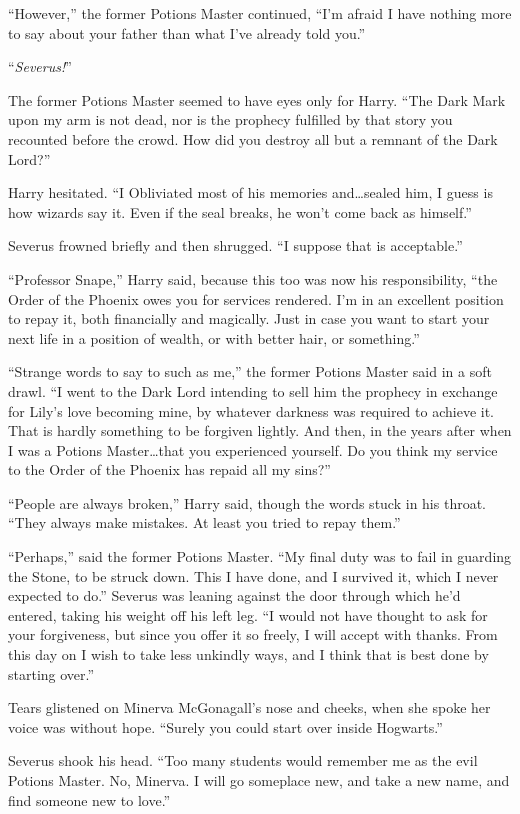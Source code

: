 “However,” the former Potions Master continued, “I’m afraid I have nothing more to say about your father than what I’ve already told you.”

“\emph{Severus!}”

The former Potions Master seemed to have eyes only for Harry. “The Dark Mark upon my arm is not dead, nor is the prophecy fulfilled by that story you recounted before the crowd. How did you destroy all but a remnant of the Dark Lord?”

Harry hesitated. “I Obliviated most of his memories and…sealed him, I guess is how wizards say it. Even if the seal breaks, he won’t come back as himself.”

Severus frowned briefly and then shrugged. “I suppose that is acceptable.”

“Professor Snape,” Harry said, because this too was now his responsibility, “the Order of the Phoenix owes you for services rendered. I’m in an excellent position to repay it, both financially and magically. Just in case you want to start your next life in a position of wealth, or with better hair, or something.”

“Strange words to say to such as me,” the former Potions Master said in a soft drawl. “I went to the Dark Lord intending to sell him the prophecy in exchange for Lily’s love becoming mine, by whatever darkness was required to achieve it. That is hardly something to be forgiven lightly. And then, in the years after when I was a Potions Master…that you experienced yourself. Do you think my service to the Order of the Phoenix has repaid all my sins?”

“People are always broken,” Harry said, though the words stuck in his throat. “They always make mistakes. At least you tried to repay them.”

“Perhaps,” said the former Potions Master. “My final duty was to fail in guarding the Stone, to be struck down. This I have done, and I survived it, which I never expected to do.” Severus was leaning against the door through which he’d entered, taking his weight off his left leg. “I would not have thought to ask for your forgiveness, but since you offer it so freely, I will accept with thanks. From this day on I wish to take less unkindly ways, and I think that is best done by starting over.”

Tears glistened on Minerva McGonagall’s nose and cheeks, when she spoke her voice was without hope. “Surely you could start over inside Hogwarts.”

Severus shook his head. “Too many students would remember me as the evil Potions Master. No, Minerva. I will go someplace new, and take a new name, and find someone new to love.”

